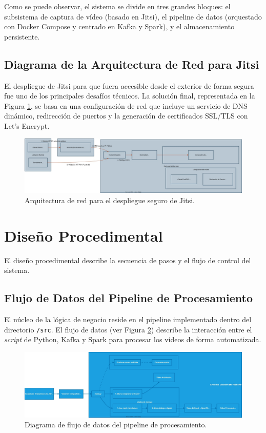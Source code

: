 Como se puede observar, el sistema se divide en tres grandes bloques: el subsistema de captura de vídeo (basado en Jitsi), el pipeline de datos (orquestado con Docker Compose y centrado en Kafka y Spark), y el almacenamiento persistente.

\subsection{Diagrama de la Arquitectura de Red para Jitsi}
El despliegue de Jitsi para que fuera accesible desde el exterior de forma segura fue uno de los principales desafíos técnicos. La solución final, representada en la Figura \ref{fig:arquitectura_red}, se basa en una configuración de red que incluye un servicio de DNS dinámico, redirección de puertos y la generación de certificados SSL/TLS con Let's Encrypt.

\begin{figure}[H]
    \centering
    \includegraphics[width=1\textwidth]{img/ArquitecturadeRedparaelDesplieguedeJitsi.jpg}
    \caption{Arquitectura de red para el despliegue seguro de Jitsi.}
    \label{fig:arquitectura_red}
\end{figure}

\section{Diseño Procedimental}
\label{sec:diseno_procedimental}
El diseño procedimental describe la secuencia de pasos y el flujo de control del sistema.

\subsection{Flujo de Datos del Pipeline de Procesamiento}
El núcleo de la lógica de negocio reside en el pipeline implementado dentro del directorio \texttt{/src}. El flujo de datos (ver Figura \ref{fig:flujo_pipeline}) describe la interacción entre el \textit{script} de Python, Kafka y Spark para procesar los vídeos de forma automatizada.

\begin{figure}[H]
    \centering
    \includegraphics[width=\textwidth]{img/FlujodeDatosdelPipelinedeProcesamiento.jpg}
    \caption{Diagrama de flujo de datos del pipeline de procesamiento.}
    \label{fig:flujo_pipeline}
\end{figure}

